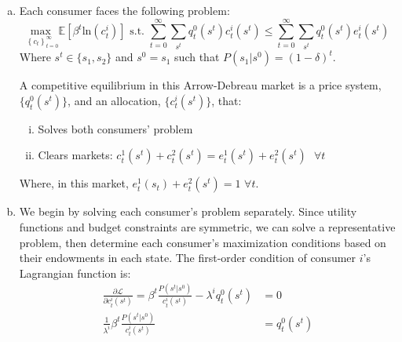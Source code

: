 \documentclass{article}
\newcommand{\loge}[1]{\text{ln}\left(#1\right)}
\newcommand{\usmax}[1]{\underset{#1}{\text{max }}}
\renewcommand{\L}{\mathcal{L}}
\newcommand{\E}[1]{\mathbb{E}\left[#1\right]} %
\begin{document}
\begin{enumerate}[(a)]
	\item Each consumer faces the following problem:
		\[
			\usmax{\left\{c_t\right\}_{t=0}^\infty}\E{\beta^t\loge{c_t^i}}\text{ s.t. }\sum_{t=0}^\infty\sum_{s^t} q^0_t(s^t)c_t^i(s^t)\leq \sum_{t=0}^\infty\sum_{s^t} q_t^0(s^t)e^i_t(s^t)
		\]
		Where ${s^t\in\{s_1,s_2\}}$ and ${s^0=s_1}$ such that ${P(s_1|s^0)=(1-\delta)^t}$.
	
		A competitive equilibrium in this Arrow-Debreau market is a price system, ${\{q^0_t(s^t)\}}$, and an allocation, ${\{c_t^i(s^t)\}}$, that:
		\begin{enumerate}[(i)]
			\item Solves both consumers' problem 
			\item Clears markets: ${c^1_t(s^t) + c^2_t(s^t) = e^1_t(s^t) + e^2_t(s^t)\text{ }\forall t}$
				
		\end{enumerate}
		Where, in this market, ${e^1_t(s_t) + e^2_t(s^t)=1}$ $\forall t$.
		
	\item We begin by solving each consumer's problem separately. Since utility functions and budget constraints are symmetric, we can solve a representative problem, then determine each consumer's maximization conditions based on their endowments in each state. The first-order condition of consumer $i$'s Lagrangian function is:
		\begin{align*}
			\frac{\partial\L}{\partial c_t^i(s^t)} = \beta^t\frac{P(s^t|s^0)}{c_t^i(s^t)} - \lambda^iq_t^0(s^t) &= 0	\\
			\frac{1}{\lambda^i}\beta^t\frac{P(s^t|s^0)}{c_t^i(s^t)}  &= q_t^0(s^t)
		\end{align*}
		

\end{enumerate}
\end{document}
